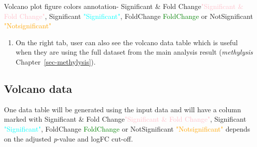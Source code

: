 \documentclass[
  a4paper,
  oneside,
  open=any]{scrreport}
\providecommand{\tightlist}{%
  \setlength{\itemsep}{0pt}\setlength{\parskip}{0pt}}\usepackage{longtable,booktabs,array}
\begin{document}
\begin{tcolorbox}[enhanced jigsaw, left=2mm, colback=white, breakable, leftrule=.75mm, coltitle=black, toprule=.15mm, rightrule=.15mm, colbacktitle=quarto-callout-tip-color!10!white, title=\textcolor{quarto-callout-tip-color}{\faLightbulb}\hspace{0.5em}{Tip}, opacitybacktitle=0.6, colframe=quarto-callout-tip-color-frame, bottomrule=.15mm, bottomtitle=1mm, toptitle=1mm, titlerule=0mm, opacityback=0, arc=.35mm]
Volcano plot figure colors annotation- {Significant \& Fold
Change}\textcolor{pink}{"Significant \& Fold Change"}, {Significant}
\textcolor{cyan}{"Significant"}, {FoldChange}
\textcolor{green}{FoldChange} or {NotSignificant}
\textcolor{orange}{"Notsignificant"}
\end{tcolorbox}

\begin{enumerate}
\def\labelenumi{\arabic{enumi}.}
\setcounter{enumi}{2}
\tightlist
\item
  On the right tab, user can also see the volcano data table which is
  useful when they are using the full dataset from the main analysis
  result (\emph{methylysis} Chapter~\ref{sec-methylysis}).
\end{enumerate}

\hypertarget{volcano-data}{%
\subsection{Volcano data}\label{volcano-data}}

One data table will be generated using the input data and will have a
column marked with {Significant \& Fold
Change}\textcolor{pink}{"Significant \& Fold Change"}, {Significant}
\textcolor{cyan}{"Significant"}, {FoldChange}
\textcolor{green}{FoldChange} or {NotSignificant}
\textcolor{orange}{"Notsignificant"} depends on the adjusted
\emph{p}-value and logFC cut-off.\\
\end{document}
